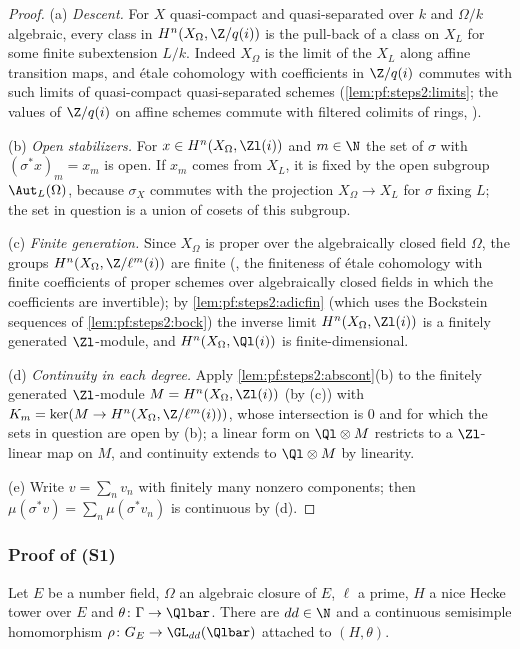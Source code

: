 \begin{proof}
(a) \emph{Descent.} For $X$ quasi-compact and quasi-separated over $k$ and $\Omega/k$ algebraic,
every class in $H^n(X_\Omega,\Z/q(i))$ is the pull-back of a class on $X_L$ for some finite
subextension $L/k$. Indeed $X_\Omega$ is the limit of the $X_L$ along affine transition maps, and
\'etale cohomology with coefficients in $\Z/q(i)$ commutes with such limits of quasi-compact
quasi-separated schemes (\cref{lem:pf:steps2:limits}; the values of $\Z/q(i)$ on affine schemes
commute with filtered colimits of rings, ).

(b) \emph{Open stabilizers.} For $x\in H^n(X_\Omega,\Zl(i))$ and $m\in\N$ the set of $\sigma$ with
$(\sigma^\ast x)_m=x_m$ is open. If $x_m$ comes from $X_L$, it is fixed by the open subgroup
$\Aut_L(\Omega)$, because $\sigma_X$ commutes with the projection $X_\Omega\to X_L$ for $\sigma$ fixing
$L$; the set in question is a union of cosets of this subgroup.

(c) \emph{Finite generation.} Since $X_\Omega$ is proper over the algebraically closed field $\Omega$,
the groups $H^n(X_\Omega,\Z/\ell^m(i))$ are finite (, the finiteness of
\'etale cohomology with finite coefficients of proper schemes over algebraically closed fields in
which the coefficients are invertible); by \cref{lem:pf:steps2:adicfin} (which uses the Bockstein
sequences of \cref{lem:pf:steps2:bock}) the inverse limit $H^n(X_\Omega,\Zl(i))$ is a finitely
generated $\Zl$-module, and $H^n(X_\Omega,\Ql(i))$ is finite-dimensional.

(d) \emph{Continuity in each degree.} Apply \cref{lem:pf:steps2:abscont}(b) to the finitely generated
$\Zl$-module $M=H^n(X_\Omega,\Zl(i))$ (by (c)) with $K_m=\ker(M\to H^n(X_\Omega,\Z/\ell^m(i)))$, whose
intersection is $0$ and for which the sets in question are open by (b); a linear
form on $\Ql\otimes M$ restricts to a $\Zl$-linear map on $M$, and continuity extends to $\Ql\otimes
M$ by linearity.

(e) Write $v=\sum_nv_n$ with finitely many nonzero components; then
$\mu(\sigma^\ast v)=\sum_n\mu(\sigma^\ast v_n)$ is continuous by (d).
\end{proof}

\subsubsection{Proof of (S1)}

\begin{theorem}[Existence]\label{thm:pf:steps2:repex}
Let $E$ be a number field, $\Omega$ an algebraic closure of $E$, $\ell$ a prime, $H$ a nice Hecke tower
over $E$ and $\theta\colon\Gamma\to\Qlbar$. There are $dd\in\N$ and a continuous semisimple
homomorphism $\rho\colon G_E\to\GL_{dd}(\Qlbar)$ attached to $(H,\theta)$.
\end{theorem}

